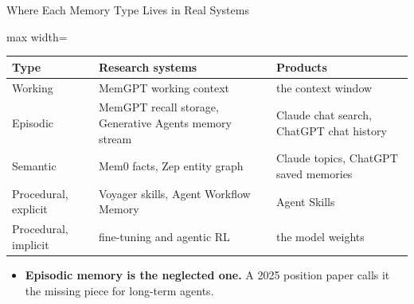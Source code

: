 \begin{frame}{Where Each Memory Type Lives in Real Systems}
    \begin{center}
    \small
    \renewcommand{\arraystretch}{1.2}
    \begin{adjustbox}{max width=\linewidth}\begin{tabular}{>{\raggedright\arraybackslash}p{2.9cm}>{\raggedright\arraybackslash}p{5.2cm}>{\raggedright\arraybackslash}p{5.0cm}}
        \toprule
        \textbf{Type} & \textbf{Research systems} & \textbf{Products} \\
        \midrule
        Working & MemGPT working context & the context window \\
        Episodic & MemGPT recall storage, Generative Agents memory stream & Claude chat search, ChatGPT chat history \\
        Semantic & Mem0 facts, Zep entity graph & Claude topics, ChatGPT saved memories \\
        Procedural, explicit & Voyager skills, Agent Workflow Memory & Agent Skills \\
        Procedural, implicit & fine-tuning and agentic RL & the model weights \\
        \bottomrule
    \end{tabular}\end{adjustbox}
    \end{center}
    \begin{itemize}\itemsep0.4em
        \item \textbf{Episodic memory is the neglected one.} A 2025 position paper calls it the missing piece for long-term agents.
    \end{itemize}
\end{frame}

